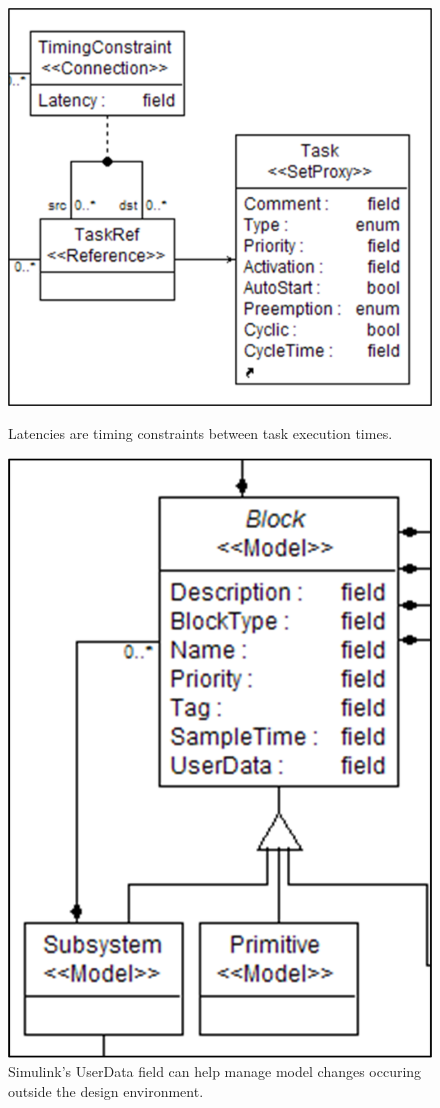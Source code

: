 \begin{figure}
	\begin{minipage}{2.25in}
	\centering
   \includegraphics[width=0.75\columnwidth]{diagrams/reqs.png}
   \caption{Latencies are timing constraints between task execution times. }
   \label{fig:reqs}
\end{minipage}
\hspace{0.125in}
	\begin{minipage}{2.375in}
	\centering
   \includegraphics[width=0.65\columnwidth]{diagrams/userdata.png}
   \caption{Simulink's UserData field can help manage model changes occuring outside the design environment. }
   \label{fig:userdata}
   \end{minipage}
\end{figure}

